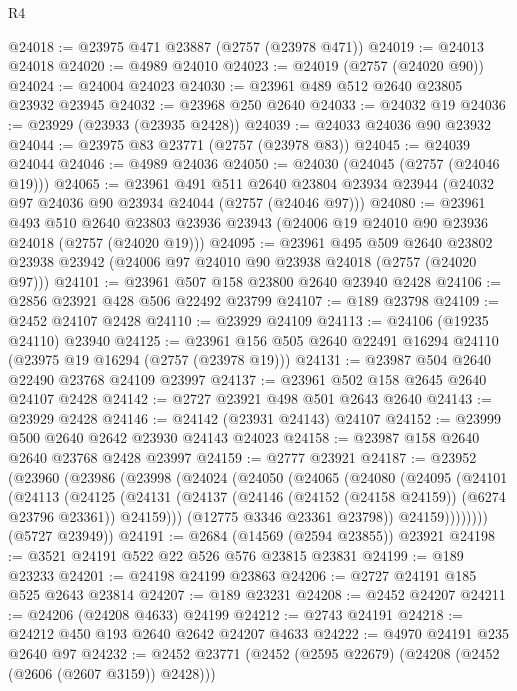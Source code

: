 \begin{lexlean}{R4}
\begin{coremodule}
@24018 := @23975 @471 @23887 (@2757 (@23978 @471))
@24019 := @24013 @24018
@24020 := @4989 @24010
@24023 := @24019 (@2757 (@24020 @90))
@24024 := @24004 @24023
@24030 := @23961 @489 @512 @2640 @23805 @23932 @23945
@24032 := @23968 @250 @2640
@24033 := @24032 @19
@24036 := @23929 (@23933 (@23935 @2428))
@24039 := @24033 @24036 @90 @23932
@24044 := @23975 @83 @23771 (@2757 (@23978 @83))
@24045 := @24039 @24044
@24046 := @4989 @24036
@24050 := @24030 (@24045 (@2757 (@24046 @19)))
@24065 := @23961
    @491
    @511
    @2640
    @23804
    @23934
    @23944
    (@24032 @97 @24036 @90 @23934 @24044 (@2757 (@24046 @97)))
@24080 := @23961
    @493
    @510
    @2640
    @23803
    @23936
    @23943
    (@24006 @19 @24010 @90 @23936 @24018 (@2757 (@24020 @19)))
@24095 := @23961
    @495
    @509
    @2640
    @23802
    @23938
    @23942
    (@24006 @97 @24010 @90 @23938 @24018 (@2757 (@24020 @97)))
@24101 := @23961 @507 @158 @23800 @2640 @23940 @2428
@24106 := @2856 @23921 @428 @506 @22492 @23799
@24107 := @189 @23798
@24109 := @2452 @24107 @2428
@24110 := @23929 @24109
@24113 := @24106 (@19235 @24110) @23940
@24125 := @23961 @156 @505 @2640 @22491 @16294 @24110 (@23975 @19 @16294 (@2757 (@23978 @19)))
@24131 := @23987 @504 @2640 @22490 @23768 @24109 @23997
@24137 := @23961 @502 @158 @2645 @2640 @24107 @2428
@24142 := @2727 @23921 @498 @501 @2643 @2640
@24143 := @23929 @2428
@24146 := @24142 (@23931 @24143) @24107
@24152 := @23999 @500 @2640 @2642 @23930 @24143 @24023
@24158 := @23987 @158 @2640 @2640 @23768 @2428 @23997
@24159 := @2777 @23921
@24187 := @23952
    (@23960
      (@23986
        (@23998
          (@24024
            (@24050
              (@24065
                (@24080
                  (@24095
                    (@24101
                      (@24113
                        (@24125
                          (@24131
                            (@24137
                              (@24146 (@24152 (@24158 @24159)) (@6274 @23796 @23361))
                              @24159)))
                        (@12775 @3346 @23361 @23798))
                      @24159))))))))
      (@5727 @23949))
@24191 := @2684 (@14569 (@2594 @23855)) @23921
@24198 := @3521 @24191 @522 @22 @526 @576 @23815 @23831
@24199 := @189 @23233
@24201 := @24198 @24199 @23863
@24206 := @2727 @24191 @185 @525 @2643 @23814
@24207 := @189 @23231
@24208 := @2452 @24207
@24211 := @24206 (@24208 @4633) @24199
@24212 := @2743 @24191
@24218 := @24212 @450 @193 @2640 @2642 @24207 @4633
@24222 := @4970 @24191 @235 @2640 @97
@24232 := @2452 @23771 (@2452 (@2595 @22679) (@24208 (@2452 (@2606 (@2607 @3159)) @2428)))

\end{coremodule}
\end{lexlean}

